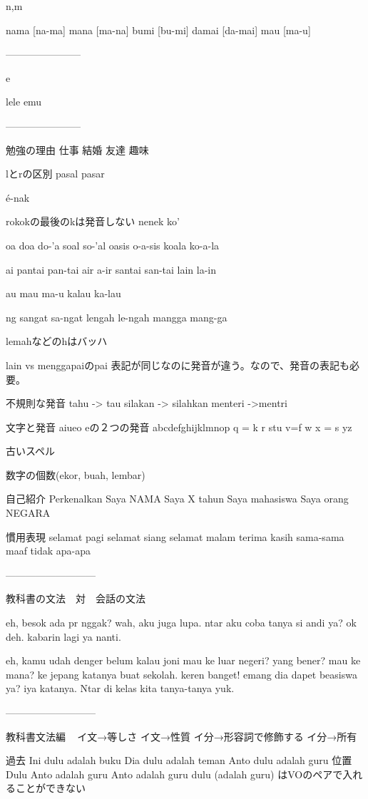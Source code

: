 \documentclass[uplatex]{jsarticle}
\theoremstyle{definition}
\begin{document}
n,m

nama [na-ma] mana [ma-na] bumi [bu-mi] damai [da-mai] mau [ma-u]

-----------------------

e

lele emu

-----------------------

勉強の理由 仕事 結婚 友達 趣味

lとrの区別 pasal pasar

é-nak

rokokの最後のkは発音しない nenek ko'

oa doa do-'a soal so-'al oasis o-a-sis koala ko-a-la

ai pantai pan-tai air a-ir santai san-tai lain la-in

au mau ma-u kalau ka-lau

ng sangat sa-ngat lengah le-ngah mangga mang-ga

lemahなどのhはバッハ

lain vs menggapaiのpai
表記が同じなのに発音が違う。なので、発音の表記も必要。

不規則な発音 tahu -> tau silakan -> silahkan menteri ->mentri

文字と発音 aiueo eの２つの発音 abcdefghijklmnop q = k r stu v=f w x = s
yz

古いスペル

数字の個数(ekor, buah, lembar)

自己紹介 Perkenalkan Saya NAMA Saya X tahun Saya mahasiswa Saya orang
NEGARA

慣用表現 selamat pagi selamat siang selamat malam terima kasih sama-sama
maaf tidak apa-apa

---------------------------

教科書の文法　対　会話の文法

eh, besok ada pr nggak?  wah, aku juga lupa. ntar aku coba tanya si andi
ya?  ok deh. kabarin lagi ya nanti.



eh, kamu udah denger belum kalau joni mau ke luar negeri?  yang bener?
mau ke mana?  ke jepang katanya buat sekolah.  keren banget! emang dia
dapet beasiswa ya?  iya katanya. Ntar di kelas kita tanya-tanya yuk.

---------------------------

教科書文法編   イ文→等しさ イ文→性質 イ分→形容詞で修飾する イ分→所有



過去 Ini dulu adalah buku Dia dulu adalah teman Anto dulu adalah guru
位置 Dulu Anto adalah guru Anto adalah guru dulu (adalah guru)
はVOのペアで入れることができない
\end{document}
